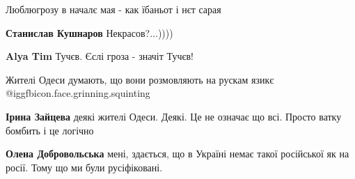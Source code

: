  
Люблюгрозу в началє мая - как їбаньот і нєт сарая

\begin{itemize}
 
\textbf{Станислав Кушнаров} Некрасов?...))))

 
\textbf{Alya Tim} Тучєв. Єслі гроза - значіт Тучєв!
\end{itemize}

 
Жителі Одеси думають, що вони розмовляють на рускам язикє @igg{fbicon.face.grinning.squinting} 

\begin{itemize}
 
\textbf{Ірина Зайцева} деякі жителі Одеси. Деякі. Це не означає що всі. Просто ватку бомбить і це логічно

 
\textbf{Олена Добровольська} мені, здається, що в Україні немає такої російської як на росії. Тому що ми були русіфіковані.
\end{itemize}

